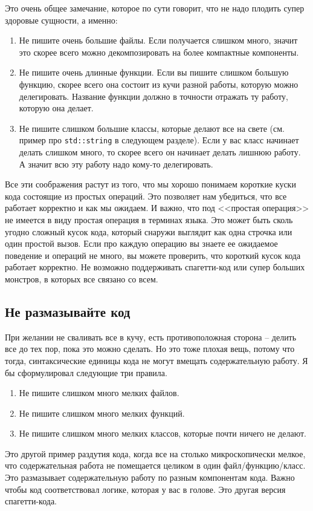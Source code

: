 Это очень общее замечание, которое по сути говорит, что не надо плодить супер здоровые сущности, а именно:
\begin{enumerate}
\item Не пишите очень большие файлы.
Если получается слишком много, значит это скорее всего можно декомпозировать на более компактные компоненты.

\item Не пишите очень длинные функции.
Если вы пишите слишком большую функцию, скорее всего она состоит из кучи разной работы, которую можно делегировать.
Название функции должно в точности отражать ту работу, которую она делает.

\item Не пишите слишком большие классы, которые делают все на свете (см. пример про \verb"std::string" в следующем разделе).
Если у вас класс начинает делать слишком много, то скорее всего он начинает делать лишнюю работу.
А значит всю эту работу надо кому-то делегировать.
\end{enumerate}
Все эти соображения растут из того, что мы хорошо понимаем короткие куски кода состоящие из простых операций.
Это позволяет нам убедиться, что все работает корректно и как мы ожидаем.
И важно, что под <<простая операция>> не имеется в виду простая операция в терминах языка.
Это может быть сколь угодно сложный кусок кода, который снаружи выглядит как одна строчка или один простой вызов.
Если про каждую операцию вы знаете ее ожидаемое поведение и операций не много, вы можете проверить, что короткий кусок кода работает корректно.
Не возможно поддерживать спагетти-код или супер больших монстров, в которых все связано со всем.

\subsection{Не размазывайте код}

При желании не сваливать все в кучу, есть противоположная сторона -- делить все до тех пор, пока это можно сделать.
Но это тоже плохая вещь, потому что тогда, синтаксические единицы кода не могут вмещать содержательную работу.
Я бы сформулировал следующие три правила.
\begin{enumerate}
\item Не пишите слишком много мелких файлов.

\item Не пишите слишком много мелких функций.

\item Не пишите слишком много мелких классов, которые почти ничего не делают.
\end{enumerate}
Это другой пример раздутия кода, когда все на столько микроскопически мелкое, что содержательная работа не помещается целиком в один файл/функцию/класс.
Это размазывает содержательную работу по разным компонентам кода.
Важно чтобы код соответствовал логике, которая у вас в голове.
Это другая версия спагетти-кода.


